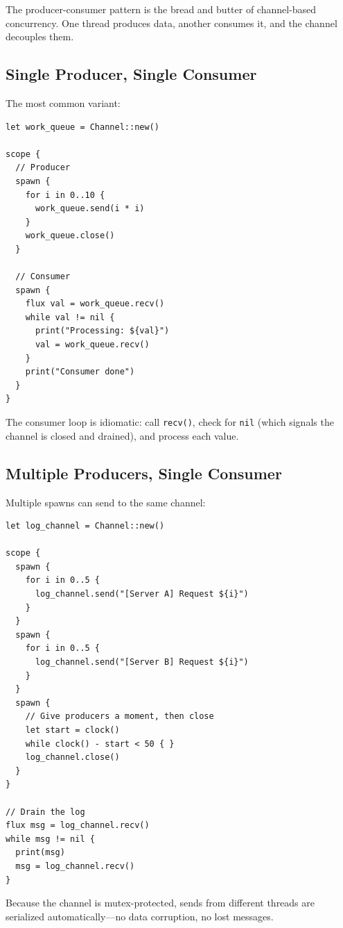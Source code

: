
The producer-consumer pattern is the bread and butter of channel-based concurrency.
One thread produces data, another consumes it, and the channel decouples them.

\subsection{Single Producer, Single Consumer}

The most common variant:

\begin{lstlisting}[language=Lattice, caption={Single producer, single consumer}]
let work_queue = Channel::new()

scope {
  // Producer
  spawn {
    for i in 0..10 {
      work_queue.send(i * i)
    }
    work_queue.close()
  }

  // Consumer
  spawn {
    flux val = work_queue.recv()
    while val != nil {
      print("Processing: ${val}")
      val = work_queue.recv()
    }
    print("Consumer done")
  }
}
\end{lstlisting}

The consumer loop is idiomatic: call \lstinline|recv()|, check for \lstinline|nil| (which signals the channel is closed and drained), and process each value.

\subsection{Multiple Producers, Single Consumer}

Multiple spawns can send to the same channel:

\begin{lstlisting}[language=Lattice, caption={Multiple producers, single consumer}]
let log_channel = Channel::new()

scope {
  spawn {
    for i in 0..5 {
      log_channel.send("[Server A] Request ${i}")
    }
  }
  spawn {
    for i in 0..5 {
      log_channel.send("[Server B] Request ${i}")
    }
  }
  spawn {
    // Give producers a moment, then close
    let start = clock()
    while clock() - start < 50 { }
    log_channel.close()
  }
}

// Drain the log
flux msg = log_channel.recv()
while msg != nil {
  print(msg)
  msg = log_channel.recv()
}
\end{lstlisting}

Because the channel is mutex-protected, sends from different threads are serialized automatically---no data corruption, no lost messages.

